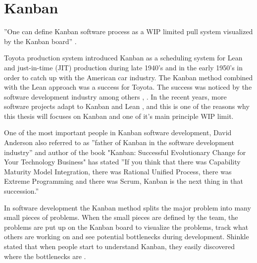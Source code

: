 \documentclass[UKenglish]{ifimaster}  %
\begin{document}
\section{Kanban}
\label{sec:Kan}

''One can define Kanban software process as a WIP limited pull system visualized by the Kanban board''  \parencite{DavidAnderson}.

Toyota production system introduced Kanban as a scheduling system for Lean and just-in-time (JIT) production during late 1940's and in the early 1950's in order to catch up with the American car industry. The Kanban method combined with the Lean approach was a success for Toyota. The success was noticed by the software development industry among others \parencite{Conboy}, \parencite{ono1988toyota}. In the recent years, more software projects adapt to Kanban and Lean \parencite{DavidAnderson}, and this is one of the reasons why this thesis will focuses on Kanban and one of it's main principle WIP limit. 


One of the most important people in Kanban software development, David Anderson  also referred to as ''father of Kanban in the software development industry''  \parencite{InfoQ:2013:May:Online} and author of the book "Kanban: Successful Evolutionary Change for Your Technology Business" has stated ''If you think that there was Capability Maturity Model Integration, there was Rational Unified Process, there was Extreme Programming and there was Scrum, Kanban is the next thing in that succession.''   \parencite{InfoQ} 

In software development the Kanban method splits the major problem into many small pieces of problems. When the small pieces are defined by the team, the problems are put up on the Kanban board to visualize the problems, track what others are working on and see potential bottlenecks during development. Shinkle stated that when people start to understand Kanban, they easily discovered where the bottlenecks are \parencite{Shinkle}.
\end{document}
